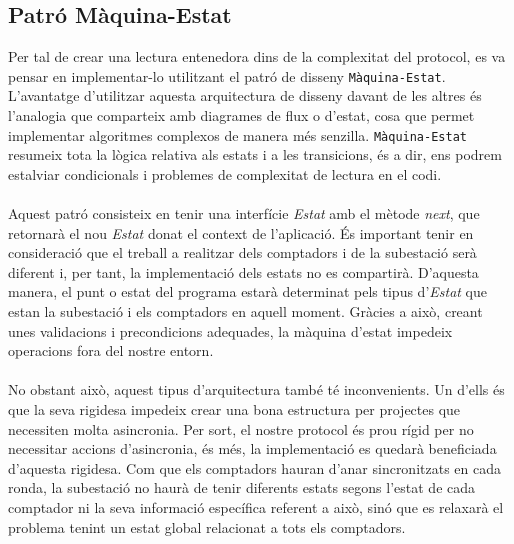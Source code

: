 \subsection{Patró Màquina-Estat}
Per tal de crear una lectura entenedora dins de la complexitat del protocol, es va pensar en implementar-lo utilitzant el patró de disseny \texttt{Màquina-Estat}. L'avantatge d'utilitzar aquesta arquitectura de disseny davant de les altres és l'analogia que comparteix amb diagrames de flux o d'estat, cosa que permet implementar algoritmes complexos de manera més senzilla. \texttt{Màquina-Estat} resumeix tota la lògica relativa als estats i a les transicions, és a dir, ens podrem estalviar condicionals i problemes de complexitat de lectura en el codi.
\\
\\
Aquest patró consisteix en tenir una interfície \textit{Estat} amb el mètode \textit{next}, que retornarà el nou \textit{Estat} donat el context de l'aplicació. És important tenir en consideració que el treball a realitzar dels comptadors i de la subestació serà diferent i, per tant, la implementació dels estats no es compartirà. D'aquesta manera, el punt o estat del programa estarà determinat pels tipus d'\textit{Estat} que estan la subestació i els comptadors en aquell moment. Gràcies a això, creant unes validacions i precondicions adequades, la màquina d’estat impedeix operacions fora del nostre entorn.
\\
\\
No obstant això, aquest tipus d'arquitectura també té inconvenients. Un d'ells és que la seva rigidesa impedeix crear una bona estructura per projectes que necessiten molta asincronia. Per sort, el nostre protocol és prou rígid per no necessitar accions d'asincronia, és més, la implementació es quedarà beneficiada d'aquesta rigidesa. Com que els comptadors hauran d'anar sincronitzats en cada ronda, la subestació no haurà de tenir diferents estats segons l'estat de cada comptador ni la seva informació específica referent a això, sinó que es relaxarà el problema tenint un estat global relacionat a tots els comptadors.
